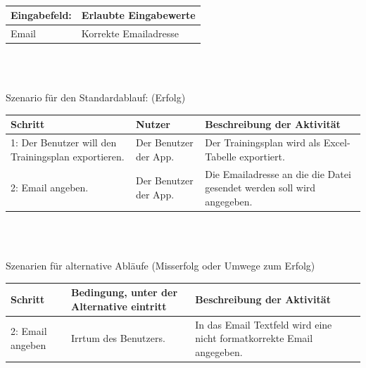 \documentclass[FIPLY_base.tex]{subfiles}
\begin{document}
		\ \\
	\begin{center}
		\def\arraystretch{1.3}%
		\begin{tabular}{| p{5cm} | p{5cm} |}
			\hline
			\textbf{Eingabefeld:} & \textbf{Erlaubte Eingabewerte} \\ \hline 
			Email & Korrekte Emailadresse \\ \hline
		\end{tabular} \\
	\end{center}
	\ \\
	Szenario für den Standardablauf: (Erfolg)
	\begin{center}	
		\def\arraystretch{1.3}%
		\begin{tabular}{| p{4cm} | p{4cm} | p{4cm} |}
			\hline
			\textbf{Schritt} & \textbf{Nutzer} & \textbf{Beschreibung der Aktivität}  \\ \hline 
			1: Der Benutzer will den Trainingsplan exportieren. & Der Benutzer der App. & Der Trainingsplan wird als Excel-Tabelle exportiert.\\ \hline
			2: Email angeben. & Der Benutzer der App. & Die Emailadresse an die die Datei gesendet werden soll wird angegeben.  \\ \hline
		\end{tabular} \\
	\end{center}
	\ \\
	Szenarien für alternative Abläufe (Misserfolg oder Umwege zum Erfolg)
	\begin{center}
		\def\arraystretch{1.3}%
		\begin{tabular}{| p{4cm} | p{4cm} | p{4cm} |}
			\hline
			\textbf{Schritt} & \textbf{Bedingung, unter der Alternative eintritt} & \textbf{Beschreibung der Aktivität}  \\ \hline 
			2: Email angeben & Irrtum des Benutzers. & In das Email Textfeld wird eine nicht formatkorrekte Email angegeben.\\ \hline
		\end{tabular} \\
	\end{center}
	\ \\
\end{document}
